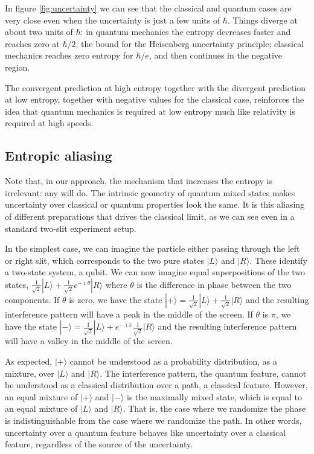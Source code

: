 \documentclass{article}
\def\>{\rangle}
\begin{document}
In figure \ref{fig:uncertainty} we can see that the classical and quantum cases are very close even when the uncertainty is just a few units of $\hbar$. Things diverge at about two units of $\hbar$: in quantum mechanics the entropy decreases faster and reaches zero at $\hbar/2$, the bound for the Heisenberg uncertainty principle; classical mechanics reaches zero entropy for $\hbar/e$, and then continues in the negative region.

The convergent prediction at high entropy together with the divergent prediction at low entropy, together with negative values for the classical case, reinforces the idea that quantum mechanics is required at low entropy much like relativity is required at high speeds.

\subsection{Entropic aliasing}

Note that, in our approach, the mechanism that increases the entropy is irrelevant: any will do. The intrinsic geometry of quantum mixed states makes uncertainty over classical or quantum properties look the same. It is this aliasing of different preparations that drives the classical limit, as we can see even in a standard two-slit experiment setup. 

In the simplest case, we can imagine the particle either passing through the left or right slit, which corresponds to the two pure states $|L\>$ and $|R\>$. These identify a two-state system, a qubit. We can now imagine equal superpositions of the two states, $\frac{1}{\sqrt{2}}|L\> + \frac{1}{\sqrt{2}} e^{-\imath \theta} |R\>$ where $\theta$ is the difference in phase between the two components. If $\theta$ is zero, we have the state $|+\> = \frac{1}{\sqrt{2}}|L\> + \frac{1}{\sqrt{2}} |R\>$ and the resulting interference pattern will have a peak in the middle of the screen. If $\theta$ is $\pi$, we have the state $|-\> = \frac{1}{\sqrt{2}}|L\> + e^{-\imath \pi}\frac{1}{\sqrt{2}} |R\>$ and the resulting interference pattern will have a valley in the middle of the screen.

As expected, $|+\>$ cannot be understood as a probability distribution, as a mixture, over $|L\>$ and $|R\>$. The interference pattern, the quantum feature, cannot be understood as a classical distribution over a path, a classical feature. However, an equal mixture of $|+\>$ and $|-\>$ is the maximally mixed state, which is equal to an equal mixture of $|L\>$ and $|R\>$. That is, the case where we randomize the phase is indistinguishable from the case where we randomize the path. In other words, uncertainty over a quantum feature behaves like uncertainty over a classical feature, regardless of the source of the uncertainty.
\end{document}
